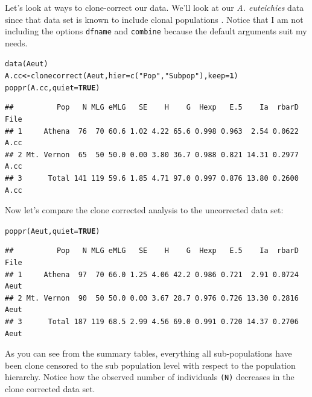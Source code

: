 \documentclass[letterpaper]{article}\usepackage[]{graphicx}\usepackage[]{color}
\makeatletter
\newcommand{\hlnum}[1]{\textcolor[rgb]{0.502,0,0.502}{\textbf{#1}}}%
\newcommand{\hlstr}[1]{\textcolor[rgb]{0.651,0.522,0}{#1}}%
\newcommand{\hlstd}[1]{\textcolor[rgb]{0,0,0}{#1}}%
\newcommand{\hlkwb}[1]{\textcolor[rgb]{0.502,0.502,0.753}{\textbf{#1}}}%
\newcommand{\hlkwc}[1]{\textcolor[rgb]{0,0.502,0.753}{#1}}%
\newcommand{\hlkwd}[1]{\textcolor[rgb]{0,0.267,0.4}{#1}}%
\newenvironment{kframe}{%
 \def\at@end@of@kframe{}%
 \ifinner\ifhmode%
  \def\at@end@of@kframe{\end{minipage}}%
  \begin{minipage}{\columnwidth}%
 \fi\fi%
 \def\FrameCommand##1{\hskip\@totalleftmargin \hskip-\fboxsep
 \colorbox{shadecolor}{##1}\hskip-\fboxsep
     \hskip-\linewidth \hskip-\@totalleftmargin \hskip\columnwidth}%
 \MakeFramed {\advance\hsize-\width
   \@totalleftmargin\z@ \linewidth\hsize
   \@setminipage}}%
 {\par\unskip\endMakeFramed%
 \at@end@of@kframe}
\newenvironment{knitrout}{}{} %
\makeatother
\begin{document}
Let's look at ways to clone-correct our data. We'll look at our \textit{A. euteichies} data since that data set is known to include clonal populations \cite{Grunwald:2006}. Notice that I am not including the options \texttt{dfname} and \texttt{combine} because the default arguments suit my needs.
\begin{knitrout}\footnotesize
{}\color{fgcolor}\begin{kframe}
\begin{alltt}
\hlkwd{data}\hlstd{(Aeut)}
\hlstd{A.cc} \hlkwb{<-} \hlkwd{clonecorrect}\hlstd{(Aeut,} \hlkwc{hier} \hlstd{=} \hlkwd{c}\hlstd{(}\hlstr{"Pop"}\hlstd{,} \hlstr{"Subpop"}\hlstd{),} \hlkwc{keep} \hlstd{=} \hlnum{1}\hlstd{)}
\hlkwd{poppr}\hlstd{(A.cc,} \hlkwc{quiet} \hlstd{=} \hlnum{TRUE}\hlstd{)}
\end{alltt}
\begin{verbatim}
##          Pop   N MLG eMLG   SE    H    G  Hexp   E.5    Ia  rbarD File
## 1     Athena  76  70 60.6 1.02 4.22 65.6 0.998 0.963  2.54 0.0622 A.cc
## 2 Mt. Vernon  65  50 50.0 0.00 3.80 36.7 0.988 0.821 14.31 0.2977 A.cc
## 3      Total 141 119 59.6 1.85 4.71 97.0 0.997 0.876 13.80 0.2600 A.cc
\end{verbatim}
\end{kframe}
\end{knitrout}

Now let's compare the clone corrected analysis to the uncorrected data set:
\begin{knitrout}\footnotesize
{}\color{fgcolor}\begin{kframe}
\begin{alltt}
\hlkwd{poppr}\hlstd{(Aeut,} \hlkwc{quiet} \hlstd{=} \hlnum{TRUE}\hlstd{)}
\end{alltt}
\begin{verbatim}
##          Pop   N MLG eMLG   SE    H    G  Hexp   E.5    Ia  rbarD File
## 1     Athena  97  70 66.0 1.25 4.06 42.2 0.986 0.721  2.91 0.0724 Aeut
## 2 Mt. Vernon  90  50 50.0 0.00 3.67 28.7 0.976 0.726 13.30 0.2816 Aeut
## 3      Total 187 119 68.5 2.99 4.56 69.0 0.991 0.720 14.37 0.2706 Aeut
\end{verbatim}
\end{kframe}
\end{knitrout}


As you can see from the summary tables, everything all sub-populations have been clone censored to the sub population level with respect to the population hierarchy. Notice how the observed number of individuals \texttt{(N)} decreases in the clone corrected data set.
\end{document}
